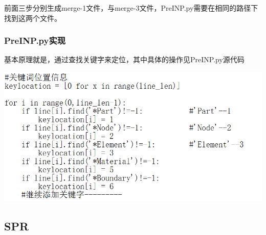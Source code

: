 \documentclass[UTF8]{ctexbook}
\begin{document}
前面三步分别生成merge-1文件，与merge-3文件，PreINP.py需要在相同的路径下找到这两个文件。

\subsubsection{PreINP.py实现}
基本原理就是，通过查找关键字来定位，其中具体的操作见PreINP.py源代码

\begin{center}
\includegraphics[width=\textwidth]{pre05.png}
\end{center}

\subsection{SPR}
\end{document}
